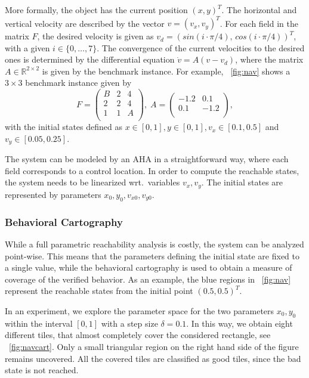 \documentclass{llncs}
\newcommand{\Reals}{\ensuremath{\mathbb{R}}}
\begin{document}
More formally, the object has the current position $(x, y)^T$. The
horizontal and vertical velocity are described by the vector $v =
(v_x, v_y)^T$. For each field in the matrix $F$, the desired velocity
is given as $v_{d} = (sin(i \cdot \pi /4), \, cos(i \cdot \pi /
4))^T$, with a given $i \in \{0,\dots,7\}$. The convergence of the current
velocities to the desired ones is determined by the differential
equation $\dot{v} = A(v - v_d)$, where the matrix $A \in
\Reals^{2\times 2}$ is given by the benchmark instance. For example,
\figurename~\ref{fig:nav} shows a $3\times 3$ benchmark instance given by
\begin{equation}\label{eq:nav}
  F = \left(
  \begin{matrix}
    B & 2 & 4 \\
    2 & 2 & 4 \\
    1 & 1 & A \\
  \end{matrix}
  \right), \;
  A = \left(
    \begin{matrix}
      -1.2 & 0.1 \\
      0.1 & -1.2 \\
    \end{matrix}
  \right),
\end{equation}
with the initial states defined as $x \in [0,1], y \in [0,1], v_x \in
[0.1, 0.5]$ and $v_y \in [0.05, 0.25]$.

The system can be modeled by an AHA in a straightforward way, where
each field corresponds to a control location. In order to compute the
reachable states, the system needs to be linearized wrt.~variables
$v_x, v_y$. The initial states are represented by parameters $x_0,
y_0, v_{x0}, v_{y0}$.

\subsubsection{Behavioral Cartography}
While a full parametric reachability analysis is costly, the system
can be analyzed point-wise. This means that the parameters defining
the initial state are fixed to a single value, while the behavioral
cartography is used to obtain a measure of coverage of the verified
behavior. As an example, the blue regions in \figurename~\ref{fig:nav}
represent the reachable states from the initial point $(0.5, 0.5)^T$.

In an experiment, we explore the parameter space for the two
parameters $x_0, y_0$ within the interval $[0,1]$ with a step size
$\delta = 0.1$. In this way, we obtain eight different tiles, that
almost completely cover the considered rectangle, see
\figurename~\ref{fig:navcart}. Only a small triangular region on the right
hand side of the figure remains uncovered. All the covered tiles are
classified as good tiles, since the bad state is not reached. 
\end{document}
